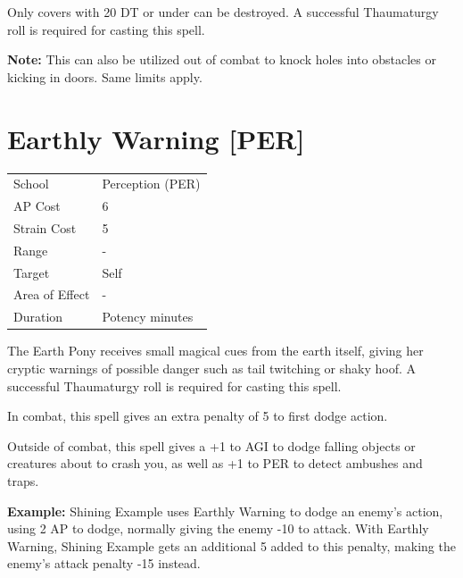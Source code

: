\documentclass[11pt,a4paper,twocolumn]{book}
\begin{document}
Only covers with 20 DT or under can be destroyed. A successful Thaumaturgy roll is required for casting this spell.

\textbf{Note:} This can also be utilized out of combat to knock holes into obstacles or kicking in doors. Same limits apply.

\vfill


\section*{Earthly Warning [PER]}
{
	\begin{tabu} to 75mm{| X[l,4] | X[l,7] |}
		\hline
		School 			& Perception (PER)	\\
        AP Cost	      	& 6 				\\
        Strain Cost     & 5 				\\
        Range     		& - 				\\
        Target      	& Self 				\\
        Area of Effect  & - 	 			\\
        Duration     	& Potency minutes 	\\ \hline
	\end{tabu}
		
}

\medskip

The Earth Pony receives small magical cues from the earth itself, giving her cryptic warnings of possible danger such as tail twitching or shaky hoof. A successful Thaumaturgy roll is required for casting this spell.

In combat, this spell gives an extra penalty of 5 to first dodge action.

Outside of combat, this spell gives a +1 to AGI to dodge falling objects or creatures about to crash you, as well as +1 to PER to detect ambushes and traps.

\textbf{Example:} Shining Example uses Earthly Warning to dodge an enemy's action, using 2 AP to dodge, normally giving the enemy -10 to attack. With Earthly Warning, Shining Example gets an additional 5 added to this penalty, making the enemy's attack penalty -15 instead.
\end{document}
